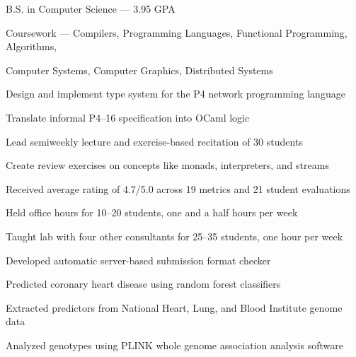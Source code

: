 \documentclass{resume}
\begin{document}
\begin{education}
    \begin{description}
        \item B.S. in Computer Science --- 3.95 GPA
        \item Coursework ---
            Compilers,
            Programming Languages,
            Functional Programming,
            Algorithms,

            Computer Systems,
            Computer Graphics,
            Distributed Systems
    \end{description}
\end{education}

\begin{experience}
    \begin{description}
        \item Design and implement type system for the P4 network programming language
        \item Translate informal P4--16 specification into OCaml logic
    \end{description}

    \begin{description}
        \item Lead semiweekly lecture and exercise-based recitation of 30 students
        \item Create review exercises on concepts like monads, interpreters, and streams
        \item Received average rating of 4.7/5.0 across 19 metrics and 21 student evaluations
    \end{description}

    \begin{description}
        \item Held office hours for 10--20 students, one and a half hours per week
        \item Taught lab with four other consultants for 25--35 students, one hour per week
        \item Developed automatic server-based submission format checker
    \end{description}

    \begin{description}
        \item Predicted coronary heart disease using random forest classifiers
        \item Extracted predictors from National Heart, Lung, and Blood Institute genome data
        \item Analyzed genotypes using PLINK whole genome association analysis software
    \end{description}
\end{experience}
\end{document}
